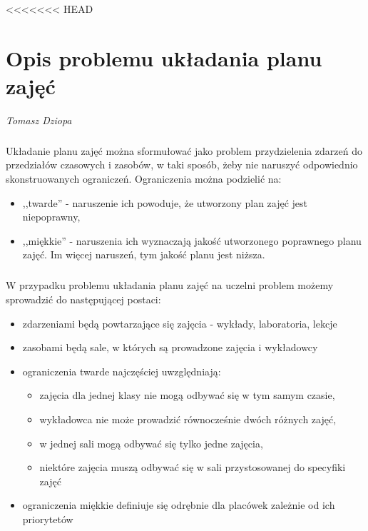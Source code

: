 <<<<<<< HEAD

\chapter{Opis problemu układania planu zajęć}
\textit{Tomasz Dziopa}
\paragraph{}Układanie planu zajęć można sformułować jako problem przydzielenia zdarzeń do przedziałów czasowych i zasobów, w taki sposób, żeby nie naruszyć odpowiednio skonstruowanych ograniczeń. Ograniczenia można podzielić na:
\begin{itemize}
\item ,,twarde'' - naruszenie ich powoduje, że utworzony plan zajęć jest niepoprawny,
\item ,,miękkie'' - naruszenia ich wyznaczają jakość utworzonego poprawnego planu zajęć. Im więcej naruszeń, tym jakość planu jest niższa.
\end{itemize}
\paragraph{}W przypadku problemu układania planu zajęć na uczelni problem możemy sprowadzić do następującej postaci:
\begin{itemize}
\item zdarzeniami będą powtarzające się zajęcia - wykłady, laboratoria, lekcje
\item zasobami będą sale, w których są prowadzone zajęcia i wykładowcy
\item ograniczenia twarde najczęściej uwzględniają:
	\begin{itemize}
	\item zajęcia dla jednej klasy nie mogą odbywać się w tym samym czasie,
	\item wykładowca nie może prowadzić równocześnie dwóch różnych zajęć,
	\item w jednej sali mogą odbywać się tylko jedne zajęcia,
	\item niektóre zajęcia muszą odbywać się w sali przystosowanej do specyfiki zajęć 
	\end{itemize}
\item ograniczenia miękkie definiuje się odrębnie dla placówek zależnie od ich priorytetów
\end{itemize}



